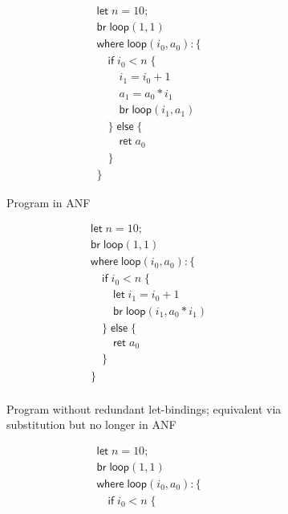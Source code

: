 \documentclass[acmsmall,screen,review]{acmart}
\newcommand{\ms}[1]{\ensuremath{\mathsf{#1}}}
\begin{document}
\begin{figure}
  \centering
  \begin{subfigure}[t]{.32\textwidth}
    \begin{align*}
      & \ms{let}\;n = 10; \\
      & \ms{br}\;\ms{loop}(1, 1) \\
      & \ms{where}\;\ms{loop}(i_0, a_0): \{\\
      & \quad \ms{if}\;i_0 < n\;\{ \\
      & \qquad i_1 = i_0 + 1 \\
      & \qquad a_1 = a_0 * i_1 \\
      & \qquad \ms{br}\;\ms{loop}(i_1, a_1) \\
      & \quad \}\;\ms{else}\;\{ \\
      & \qquad \ms{ret}\;a_0 \\
      & \quad \} \\
      & \}
    \end{align*}
    \caption{Program in ANF}
  \end{subfigure}%
  \begin{subfigure}[t]{.32\textwidth}
    \begin{align*}
      & \ms{let}\;n = 10; \\
      & \ms{br}\;\ms{loop}(1, 1) \\
      & \ms{where}\;\ms{loop}(i_0, a_0): \{\\
      & \quad \ms{if}\;i_0 < n\;\{ \\
      & \qquad \ms{let}\;i_1 = i_0 + 1 \\
      & \qquad \ms{br}\;\ms{loop}(i_1, a_0 * i_1) \\
      & \quad \}\;\ms{else}\;\{ \\
      & \qquad \ms{ret}\;a_0 \\
      & \quad \} \\
      & \}  \\
    \end{align*}
    \caption{
      Program without redundant let-bindings; equivalent via substitution but no longer in ANF
    }
  \end{subfigure}%
  \begin{subfigure}[t]{.35\textwidth}
    \begin{align*}
      & \ms{let}\;n = 10; \\
      & \ms{br}\;\ms{loop}(1, 1) \\
      & \ms{where}\;\ms{loop}(i_0, a_0): \{\\
      & \quad \ms{if}\;i_0 < n\;\{ \\

\end{align*}
\end{subfigure}
\end{figure}
\end{document}
